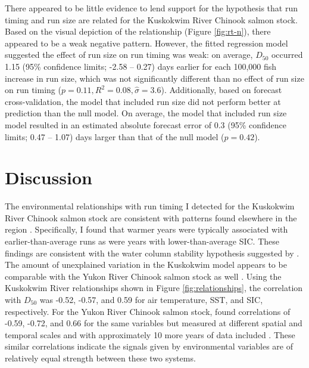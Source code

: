 \documentclass[12pt,]{book}
\theoremstyle{definition}
\theoremstyle{definition}
\theoremstyle{definition}
\theoremstyle{remark}
\begin{document}
\noindent
There appeared to be little evidence to lend support for the hypothesis
that run timing and run size are related for the Kuskokwim River Chinook
salmon stock. Based on the visual depiction of the relationship (Figure
\ref{fig:rt-n}), there appeared to be a weak negative pattern. However,
the fitted regression model suggested the effect of run size on run
timing was weak: on average, \(D_{50}\) occurred 1.15 (95\% confidence
limits; -2.58 -- 0.27) days earlier for each 100,000 fish increase in
run size, which was not significantly different than no effect of run
size on run timing (\(p = 0.11, R^2 = 0.08, \hat{\sigma} = 3.6\)).
Additionally, based on forecast cross-validation, the model that
included run size did not perform better at prediction than the null
model. On average, the model that included run size model resulted in an
estimated absolute forecast error of 0.3 (95\% confidence limits; 0.47
-- 1.07) days larger than that of the null model (\(p = 0.42\)).

\section{Discussion}\label{discussion}

\noindent
The environmental relationships with run timing I detected for the
Kuskokwim River Chinook salmon stock are consistent with patterns found
elsewhere in the region
\citep[\emph{e}.\emph{g}.,][]{mundy-evenson-2011, hodgson-etal-2006}.
Specifically, I found that warmer years were typically associated with
earlier-than-average runs as were years with lower-than-average SIC.
These findings are consistent with the water column stability hypothesis
suggested by \citet{mundy-evenson-2011}. The amount of unexplained
variation in the Kuskokwim model appears to be comparable with the Yukon
River Chinook salmon stock as well \citep{mundy-evenson-2011}. Using the
Kuskokwim River relationships shown in Figure \ref{fig:relationships},
the correlation with \(D_{50}\) was -0.52, -0.57, and 0.59 for air
temperature, SST, and SIC, respectively. For the Yukon River Chinook
salmon stock, \citet{mundy-evenson-2011} found correlations of -0.59,
-0.72, and 0.66 for the same variables but measured at different spatial
and temporal scales and with approximately 10 more years of data
included \citep[Table 2 in][]{mundy-evenson-2011}. These similar
correlations indicate the signals given by environmental variables are
of relatively equal strength between these two systems.
\end{document}
